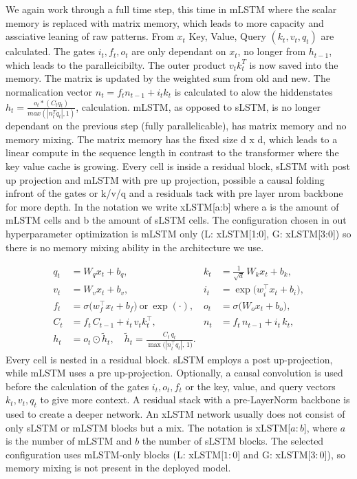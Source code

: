 We again work through a full time step, this time in mLSTM where the scalar memory is replaced with matrix memory, which leads to more capacity and assciative leaning of raw patterns. From $x_t$ Key, Value, Query $(k_t, v_t, q_t)$ are calculated. The gates $i_t, f_t, o_t$ are only dependant on $x_t$, no longer from $h_{t-1}$, which leads to the paralleicibilty. The outer product $v_t k_t^T$ is now saved into the memory. The matrix is updated by the weighted sum from old and new. The normalication vector $n_t = f_t n_{t-1} + i_t k_t$ is calculated to alow the hiddenstates $h_t =\frac{o_t * (C_t q_t)}{max(|n_t^T q_t|, 1)}$, calculation. mLSTM, as opposed to sLSTM, is no longer dependant on the previous step (fully parallelicable), has matrix memory and no memory mixing. The matrix memory has the fixed size d x d, which leads to a linear compute in the sequence length in contrast to the transformer where the key value cache is growing. Every cell is inside a residual block, sLSTM with post up projection and mLSTM with pre up projection, possible a causal folding infront of the gates or k/v/q and a residuals tack with pre layer nrom backbone for more depth. In the notation we write xLSTM[a:b] where a is the amount of mLSTM cells and b the amount of sLSTM cells. The configuration chosen in out hyperparameter optimization is mLSTM only (L: xLSTM[1:0], G: xLSTM[3:0]) so there is no memory mixing ability in the architecture we use.


\begin{align}
  q_t &= W_q x_t + b_q, &
  k_t &= \tfrac{1}{\sqrt{d}}\,W_k x_t + b_k, \label{eq:mlstm-qk}\\
  v_t &= W_v x_t + b_v, &
  i_t &= \exp\!\big(w_i^\top x_t + b_i\big), \label{eq:mlstm-vi}\\
  f_t &= \sigma\!\big(w_f^\top x_t + b_f\big)\ \text{or}\ \exp(\cdot), &
  o_t &= \sigma\!\big(W_o x_t + b_o\big), \label{eq:mlstm-fo}\\
  C_t &= f_t\,C_{t-1} + i_t\,v_t k_t^\top, &
  n_t &= f_t\,n_{t-1} + i_t\,k_t, \label{eq:mlstm-Cn}\\
  h_t &= o_t\odot\tilde{h}_t,\quad
        \tilde{h}_t = \frac{C_t\,q_t}{\max\!\big(|n_t^\top q_t|,\,1\big)}. &&  \label{eq:mlstm-h}
\end{align}
Every cell is nested in a residual block. sLSTM employs a post up-projection,
while mLSTM uses a pre up-projection. Optionally, a causal convolution is used
before the calculation of the gates $i_t,o_t,f_t$ or the key, value, and query
vectors $k_t,v_t,q_t$ to give more context. A residual stack with a pre-LayerNorm
backbone is used to create a deeper network. An xLSTM network usually does not
consist of only sLSTM or mLSTM blocks but a mix. The notation is xLSTM[$a{:}b$],
where $a$ is the number of mLSTM and $b$ the number of sLSTM blocks. The selected
configuration uses mLSTM-only blocks (L: xLSTM[$1{:}0$] and G: xLSTM[$3{:}0$]), so
memory mixing is not present in the deployed model.

